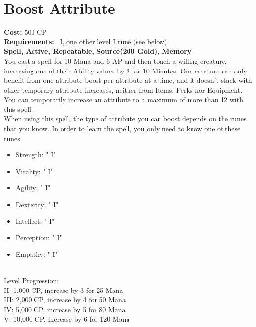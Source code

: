 \section{Boost Attribute}\label{spell:boostAttribute}
\textbf{Cost:} 500 CP\\
\textbf{Requirements:}~ I, one other level I rune (see below)\\
\textbf{Spell, Active, Repeatable, Source(200 Gold), Memory}\\
You cast a spell for 10 Mana and 6 AP and then touch a willing creature, increasing one of their Ability values by 2 for 10 Minutes.
One creature can only benefit from one attribute boost per attribute at a time, and it doesn't stack with other temporary attribute increases, neither from Items, Perks nor Equipment.
You can temporarily increase an attribute to a maximum of more than 12 with this spell.\\
When using this spell, the type of attribute you can boost depends on the runes that you know.
In order to learn the spell, you only need to know one of these runes.\\
\begin{itemize}
    \item Strength: " I"
    \item Vitality: " I"
    \item Agility: " I"
    \item Dexterity: " I"
    \item Intellect: " I"
    \item Perception: " I"
    \item Empathy: " I"
\end{itemize}
\\
Level Progression:\\
II: 1,000 CP, increase by 3 for 25 Mana\\
III: 2,000 CP, increase by 4 for 50 Mana\\
IV: 5,000 CP, increase by 5 for 80 Mana\\
V: 10,000 CP, increase by 6 for 120 Mana\\